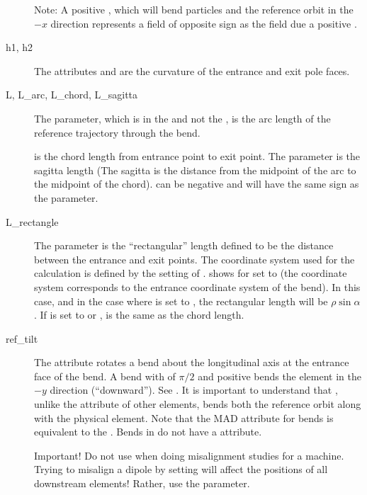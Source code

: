 \begin{description}
Note: A positive , which will bend particles and the reference orbit in the $-x$ direction
represents a field of opposite sign as the field due a positive .
  \item[h1, h2] \Newline
The attributes  and  are the curvature of the entrance and exit pole faces.
  \item[L, L_arc, L_chord, L_sagitta]  \Newline
The  parameter, which is in the  and not the , 
is the arc length of the reference trajectory through the bend.

 is the chord length from entrance point to exit point.
The  parameter is the sagitta length (The sagitta is the distance
from the midpoint of the arc to the midpoint of the chord).  can be negative and will have
the same sign as the  parameter.
  \item[L_rectangle] \Newline
The  parameter is the ``rectangular'' length defined to be the distance between the
entrance and exit points. The coordinate system used for the calculation is defined by the setting
of .  shows  for  set to
 (the coordinate system corresponds to the entrance coordinate system of the bend).
In this case, and in the case where  is set to , the rectangular
length will be $\rho \sin\alpha$. If  is set to  or ,
 is the same as the chord length.
  \item[ref_tilt] \Newline
The  attribute rotates a bend about the longitudinal axis at the entrance face of the
bend. A bend with  of $\pi/2$ and positive  bends the element in the $-y$
direction (``downward''). See . It is important to understand that ,
unlike the  attribute of other elements, bends both the reference orbit along with the
physical element. Note that the MAD  attribute for bends is equivalent to the \bmad
{}. Bends in \bmad do not have a  attribute.

Important! Do not use  when doing misalignment studies for a machine. Trying to misalign
a dipole by setting  will affect the positions of all downstream elements! Rather, use the
 parameter.
  \end{description}

